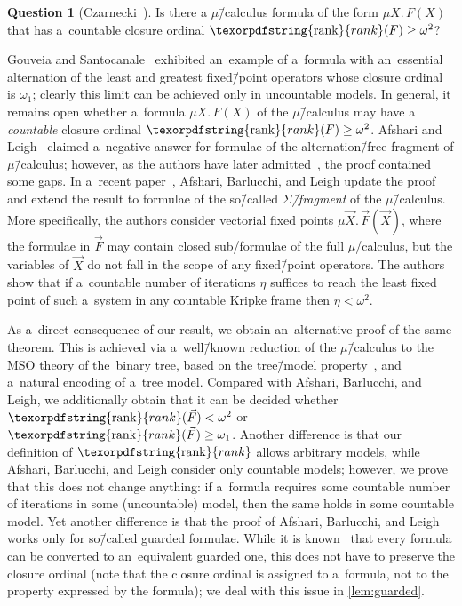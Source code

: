 \documentclass[11pt,a4paper]{amsart}
\theoremstyle{plain}
\theoremstyle{definition}
\newtheorem{qu}[thm]{Question}
\theoremstyle{defC}
\theoremstyle{thmC}
\theoremstyle{plain}
\numberwithin{equation}{section}
\numberwithin{equation}{section}
\numberwithin{figure}{section}
\newcommand{\ident}[1]{\ensuremath{\texorpdfstring{\mathrm{\mathnm{#1}}}{#1}}\xspace}
\newcommand{\mathnm}[1]{#1}
\newcommand{\limit}{\ident{rank}}
\begin{document}
\begin{qu}[{Czarnecki~\cite{czarnecki_closure_fics}}]\label{con:czarnecki}
	Is there a $\mu$\=/calculus formula of the form $\mu X.\,F(X)$ that has a~countable closure ordinal $\limit(F)\geq\omega^2$?
\end{qu}

Gouveia and Santocanale~\cite{santocanale-closure} exhibited an~example of a~formula with an~essential alternation of the least and greatest fixed\=/point operators whose closure ordinal is $\omega_1$; clearly this limit can be achieved only in uncountable models.
In general, it remains open whether a~formula $\mu X.\,F(X)$ of the $\mu$\=/calculus may have a \emph{countable} closure ordinal $\limit(F) \geq \omega^2$.
Afshari and Leigh~\cite{afshari_closure} claimed a~negative answer for formulae of the alternation\=/free fragment of $\mu$\=/calculus;
however, as the authors have later admitted~\cite{afshari_limit_fics}, the proof contained some gaps.
In a~recent paper~\cite{afshari_limit_fics}, Afshari, Barlucchi, and Leigh update the proof and extend the result to formulae of the so\=/called \emph{$\Sigma$\=/fragment} of the $\mu$\=/calculus.
More specifically, the authors consider vectorial fixed points $\mu \vec{X}.\,\vec{F}(\vec{X})$,
where the formulae in $\vec{F}$ may contain closed sub\=/formulae of the full $\mu$\=/calculus, but the variables of $\vec{X}$ do not fall in the scope of any fixed\=/point operators.
The authors show that if a~countable number of iterations $\eta$ suffices to reach the least fixed point of such a~system in any countable Kripke frame then $\eta < \omega^2$.

As a~direct consequence of our result, we obtain an~alternative proof of the same theorem.
This is achieved via a~well\=/known reduction of the $\mu$\=/calculus to the MSO theory of the~binary tree,
based on the tree\=/model property~\cite{julian-igor-handook}, and a~natural encoding of a~tree model.
Compared with Afshari, Barlucchi, and Leigh, we additionally obtain that it can be decided whether $\limit(\vec{F}) < \omega^2$ or $\limit(\vec{F})\geq\omega_1$.
Another difference is that our definition of $\limit$ allows arbitrary models, while Afshari, Barlucchi, and Leigh consider only countable models;
however, we prove that this does not change anything: if a~formula requires some countable number of iterations in some (uncountable) model, then the same holds in some countable model.
Yet another difference is that the proof of Afshari, Barlucchi, and Leigh works only for so\=/called guarded formulae.
While it is known~\cite{kozen-mu-calc} that every formula can be converted to an~equivalent guarded one, this does not have to preserve the closure ordinal
(note that the closure ordinal is assigned to a~formula, not to the property expressed by the formula); we deal with this issue in \cref{lem:guarded}.
\end{document}
